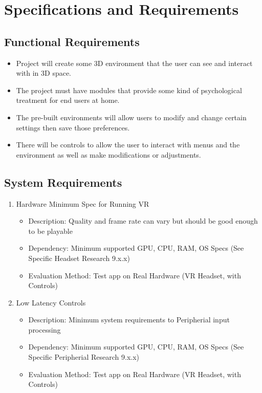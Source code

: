 \documentclass[a4paper,10pt]{article}
\begin{document}
\section{Specifications and Requirements}
	\subsection{Functional Requirements}
	\begin{itemize}
		\item Project will create some 3D environment that the user can see and interact with in 3D space.
		\item The project must have modules that provide some kind of psychological treatment for end users at home.
		\item The pre-built environments will allow users to modify and change certain settings then save those preferences.
		\item There will be controls to allow the user to interact with menus and the environment as well as make modifications or adjustments.
	\end{itemize}
	\subsection{System Requirements}
	\begin{enumerate}
	 \item Hardware Minimum Spec for Running VR
	 \begin{itemize}
	  \item Description: Quality and frame rate can vary but should be good enough to be playable
	  \item Dependency: Minimum supported GPU, CPU, RAM, OS Specs (See Specific Headset Research 9.x.x) 
	  \item Evaluation Method: Test app on Real Hardware (VR Headset, with Controls)
	 \end{itemize}
	 \item Low Latency Controls
	 \begin{itemize}
	  \item Description: Minimum system requirements to Peripherial input processing
	  \item Dependency: Minimum supported GPU, CPU, RAM, OS Specs (See Specific Peripherial Research 9.x.x) 
	  \item Evaluation Method: Test app on Real Hardware (VR Headset, with Controls)
	 \end{itemize}
	\end{enumerate}
	
\end{document}
